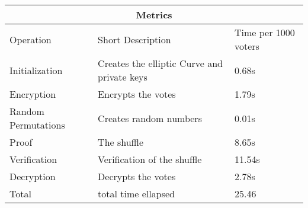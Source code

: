 \begin{tabular}{ |p{3cm}|p{5cm}|p{3cm}|  }
    \hline
    \multicolumn{3}{|c|}{Metrics}\\
    \hline
    Operation & Short Description & Time per 1000 voters\\
    \hline
    Initialization & Creates the elliptic Curve and private keys & 0.68s\\
    Encryption & Encrypts the votes & 1.79s\\
    Random Permutations & Creates random numbers & 0.01s\\
    Proof & The shuffle & 8.65s\\
    Verification & Verification of the shuffle & 11.54s\\
    Decryption & Decrypts the votes & 2.78s\\
    Total & total time ellapsed & 25.46
    \hline
\end{tabular}
